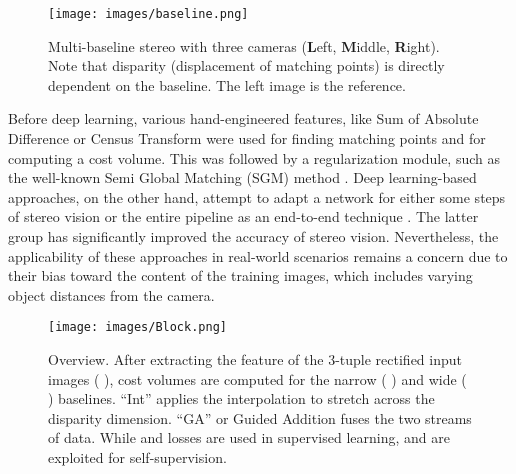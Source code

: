 \documentclass[10pt,twocolumn,letterpaper]{article}
\begin{document}
\begin{figure}[t]
	\begin{center}
		\texttt{[image: images/baseline.png]}
	\end{center}
	\vspace{-0.6cm}
	\caption{Multi-baseline stereo with three cameras (\textbf{L}eft, \textbf{M}iddle, \textbf{R}ight). Note that disparity (displacement of matching points) is directly dependent on the baseline. The left image is the reference.}
	\label{fig:baseline}
\end{figure} Before deep learning, various hand-engineered features, like Sum of Absolute Difference or Census Transform \cite{zabih1994non} were used for finding matching points and for computing a cost volume. This was followed by a regularization module, such as the well-known Semi Global Matching (SGM) method \cite{hirschmuller2005accurate}. Deep learning-based approaches, on the other hand, attempt to adapt a network for either some steps of stereo vision \cite{vzbontar2016stereo,seki2017sgm} or the entire pipeline as an end-to-end technique \cite{kendall2017end,chang2018pyramid,guo2019group,zhang2019ga}. The latter group has significantly improved the accuracy of stereo vision. 
Nevertheless, the applicability of these approaches in real-world scenarios remains a concern due to their bias toward the content of the training images, which includes varying object distances from the camera.
\begin{figure*}[t]
	\begin{center}
		\texttt{[image: images/Block.png]}
	\end{center}
	\vspace{-0.5cm}
	\caption{Overview. After extracting the feature of the 3-tuple rectified input images (  ), cost volumes are computed for the narrow (  ) and wide (  ) baselines. \enquote{Int} applies the interpolation to stretch   across the disparity dimension. \enquote{GA} or Guided Addition fuses the two streams of data. While  and  losses are used in supervised learning,  and  are exploited for self-supervision.}
	\label{fig:generalframework}
\end{figure*} 
\end{document}
